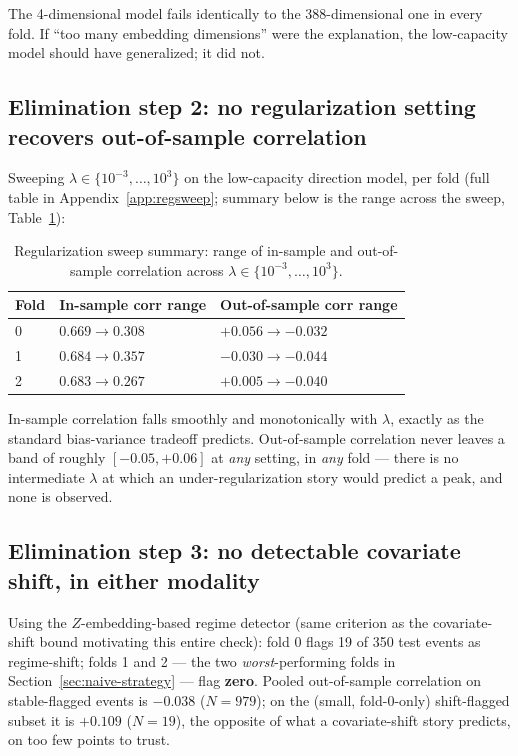 \documentclass[11pt]{article}
\begin{document}
The 4-dimensional model fails identically to the 388-dimensional one in every fold. If ``too many embedding dimensions'' were the explanation, the low-capacity model should have generalized; it did not.

\subsection{Elimination step 2: no regularization setting recovers out-of-sample correlation}

Sweeping $\lambda\in\{10^{-3},\dots,10^{3}\}$ on the low-capacity direction model, per fold (full table in Appendix~\ref{app:regsweep}; summary below is the range across the sweep, Table~\ref{tab:regsweep-summary}):

\begin{table}[H]
\centering
\caption{Regularization sweep summary: range of in-sample and out-of-sample correlation across $\lambda\in\{10^{-3},\dots,10^{3}\}$.}
\label{tab:regsweep-summary}
\begin{tabular}{@{}lll@{}}
\toprule
Fold & In-sample corr range & Out-of-sample corr range \\
\midrule
0 & $0.669 \to 0.308$ & $+0.056 \to -0.032$ \\
1 & $0.684 \to 0.357$ & $-0.030 \to -0.044$ \\
2 & $0.683 \to 0.267$ & $+0.005 \to -0.040$ \\
\bottomrule
\end{tabular}
\end{table}

In-sample correlation falls smoothly and monotonically with $\lambda$, exactly as the standard bias-variance tradeoff predicts. Out-of-sample correlation never leaves a band of roughly $[-0.05, +0.06]$ at \emph{any} setting, in \emph{any} fold --- there is no intermediate $\lambda$ at which an under-regularization story would predict a peak, and none is observed.

\subsection{Elimination step 3: no detectable covariate shift, in either modality}

Using the $Z$-embedding-based regime detector (same criterion as the covariate-shift bound motivating this entire check): fold 0 flags 19 of 350 test events as regime-shift; folds 1 and 2 --- the two \emph{worst}-performing folds in Section~\ref{sec:naive-strategy} --- flag \textbf{zero}. Pooled out-of-sample correlation on stable-flagged events is $-0.038$ ($N=979$); on the (small, fold-0-only) shift-flagged subset it is $+0.109$ ($N=19$), the opposite of what a covariate-shift story predicts, on too few points to trust.
\end{document}
